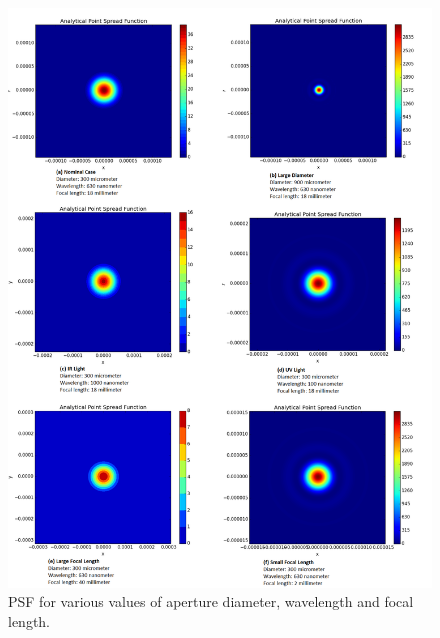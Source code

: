 \begin{figure}[H]
	\centering
		\includegraphics[width=1.0\textwidth]{figures/VarySysParams.png}
	\caption{PSF for various values of aperture diameter, wavelength and focal length. }
	\label{fig:VaryParams}
\end{figure}


